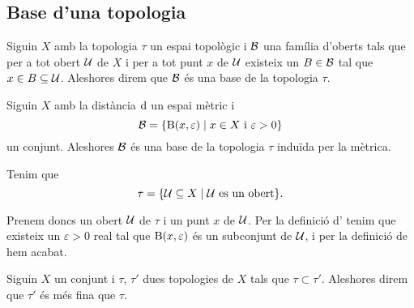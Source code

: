 \documentclass[../Apunts.tex]{subfiles}
\begin{document}
	\subsection{Base d'una topologia}
	\begin{definition}
		\label{def:base d'una topologia}
		Siguin \(X\) amb la topologia \(\tau\) un espai topològic i \(\mathcal{B}\) una família d'oberts tals que per a tot obert \(\mathcal{U}\) de \(X\) i per a tot punt \(x\) de \(\mathcal{U}\) existeix un \(B\in\mathcal{B}\) tal que \(x\in B\subseteq\mathcal{U}\). Aleshores direm que \(\mathcal{B}\) és una base de la topologia \(\tau\).
	\end{definition}
	\begin{example}
		Siguin \(X\) amb la distància \(\operatorname{d}\) un espai mètric i
		\[\mathcal{B}=\{\operatorname{B}(x,\varepsilon)\mid x\in X\text{ i }\varepsilon>0\}\]
		un conjunt. Aleshores \(\mathcal{B}\) és una base de la topologia \(\tau\) induïda per la mètrica.
		\begin{solution}
			Tenim que
			\[\tau=\{\mathcal{U}\subseteq X\mid\mathcal{U}\text{ es un obert}\}.\]
			
			Prenem doncs un obert \(\mathcal{U}\) de \(\tau\) i un punt \(x\) de \(\mathcal{U}\). Per la definició d' tenim que existeix un \(\varepsilon>0\) real tal que \(\operatorname{B}(x,\varepsilon)\) és un subconjunt de \(\mathcal{U}\), i per la definició de  hem acabat.
		\end{solution}
	\end{example}
	\begin{definition}
		\label{def:finor d'una topologia}
		Siguin \(X\) un conjunt i \(\tau\), \(\tau'\) dues topologies de \(X\) tals que \(\tau\subset\tau'\). Aleshores direm que \(\tau'\) és més fina que \(\tau\).
	\end{definition}
%			
\end{document}
